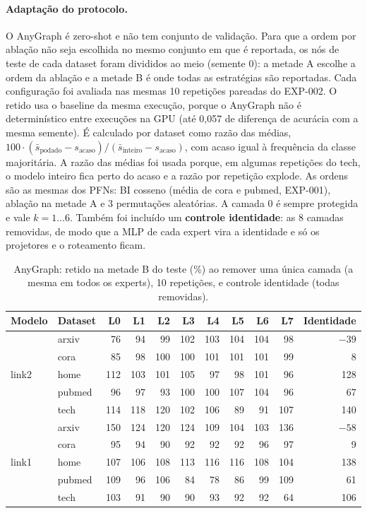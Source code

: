 \documentclass[12pt,a4paper]{article}
\newcommand{\ruim}[1]{\textcolor{red!70!black}{#1}}
\begin{document}
\paragraph{Adaptação do protocolo.} O AnyGraph é zero-shot e não tem conjunto de validação. Para que a ordem por ablação não seja escolhida no mesmo conjunto em que é reportada, os nós de teste de cada dataset foram divididos ao meio (semente 0): a metade A escolhe a ordem da ablação e a metade B é onde todas as estratégias são reportadas. Cada configuração foi avaliada nas mesmas 10 repetições pareadas do EXP-002. O retido usa o baseline da mesma execução, porque o AnyGraph não é determinístico entre execuções na GPU (até 0,057 de diferença de acurácia com a mesma semente). É calculado por dataset como razão das médias, $100\cdot(\bar s_{\text{podado}}-s_{\text{acaso}})/(\bar s_{\text{inteiro}}-s_{\text{acaso}})$, com acaso igual à frequência da classe majoritária. A razão das médias foi usada porque, em algumas repetições do tech, o modelo inteiro fica perto do acaso e a razão por repetição explode. As ordens são as mesmas dos PFNs: BI cosseno (média de cora e pubmed, EXP-001), ablação na metade A e 3 permutações aleatórias. A camada 0 é sempre protegida e vale $k=1\ldots6$. Também foi incluído um \textbf{controle identidade}: as 8 camadas removidas, de modo que a MLP de cada expert vira a identidade e só os projetores e o roteamento ficam.

\begin{table}[H]
\centering
\caption{AnyGraph: retido na metade B do teste (\%) ao remover uma única camada (a mesma em todos os experts), 10 repetições, e controle identidade (todas removidas).}
\label{tab:any-loo}
\setlength{\tabcolsep}{4pt}
\begin{tabular}{@{}llrrrrrrrr|r@{}}
\toprule
Modelo & Dataset & L0 & L1 & L2 & L3 & L4 & L5 & L6 & L7 & Identidade \\
\midrule
\multirow{5}{*}{link2} & arxiv  & \ruim{76} & 94 & 99 & 102 & 103 & 104 & 104 & 98 & \ruim{$-39$} \\
 & cora   & 85 & 98 & 100 & 100 & 101 & 101 & 101 & 99 & \ruim{8} \\
 & home   & 112 & 103 & 101 & 105 & 97 & 98 & 101 & 96 & 128 \\
 & pubmed & 96 & 97 & 93 & 100 & 100 & 107 & 104 & 96 & 67 \\
 & tech   & 114 & 118 & 120 & 102 & 106 & 89 & 91 & 107 & 140 \\
\midrule
\multirow{5}{*}{link1} & arxiv  & 150 & 124 & 120 & 124 & 109 & 104 & 103 & 136 & \ruim{$-58$} \\
 & cora   & 95 & 94 & 90 & 92 & 92 & 92 & 96 & 97 & \ruim{9} \\
 & home   & 107 & 106 & 108 & 113 & 116 & 116 & 108 & 104 & 138 \\
 & pubmed & 109 & 96 & 106 & 84 & 78 & 86 & 99 & 109 & 61 \\
 & tech   & 103 & 91 & 90 & 90 & 93 & 92 & 92 & \ruim{64} & 106 \\
\bottomrule
\end{tabular}
\end{table}
\end{document}
